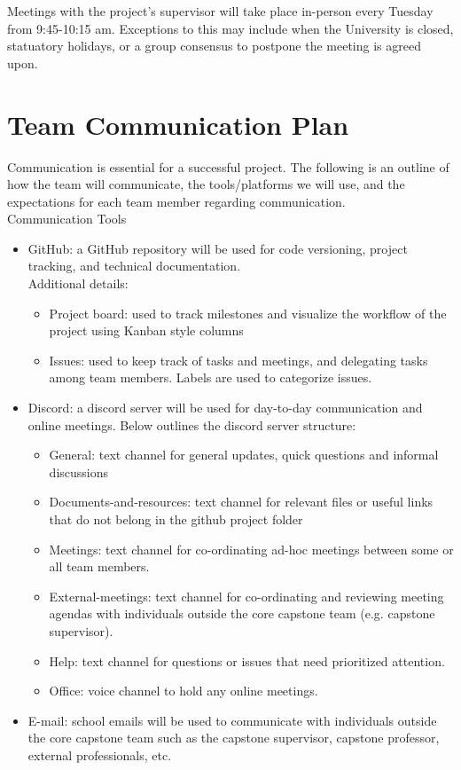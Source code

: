\documentclass{article}
\begin{document}
Meetings with the project's supervisor will take place in-person every Tuesday from 9:45-10:15 am. Exceptions 
to this may include when the University is closed, statuatory holidays, or a group consensus to postpone the 
meeting is agreed upon.

\section{Team Communication Plan}

Communication is essential for a successful project. The following is an outline of how the team will 
communicate, the tools/platforms we will use, and the expectations for each team member regarding communication.\\

Communication Tools
\begin{itemize}
  \item GitHub: a GitHub repository will be used for code versioning, project tracking, and technical documentation.\\
  Additional details:
  \begin{itemize}
    \item Project board: used to track milestones and visualize the workflow of the project using Kanban style columns
    \item Issues: used to keep track of tasks and meetings, and delegating tasks among team members. Labels are used
     to categorize issues.
  \end{itemize}
  \item Discord: a discord server will be used for day-to-day communication and online meetings. Below outlines the 
  discord server structure:
  \begin{itemize}
    \item General: text channel for general updates, quick questions and informal discussions
    \item Documents-and-resources: text channel for relevant files or useful links that do not belong in the github 
    project folder
    \item Meetings: text channel for co-ordinating ad-hoc meetings between some or all team members.
    \item External-meetings: text channel for co-ordinating and reviewing meeting agendas with individuals 
    outside the core capstone team (e.g. capstone supervisor).
    \item Help: text channel for questions or issues that need prioritized attention.
    \item Office: voice channel to hold any online meetings.
  \end{itemize}
  \item E-mail: school emails will be used to communicate with individuals outside the core capstone team such as the 
  capstone supervisor, capstone professor, external professionals, etc.
\end{itemize}
\end{document}
